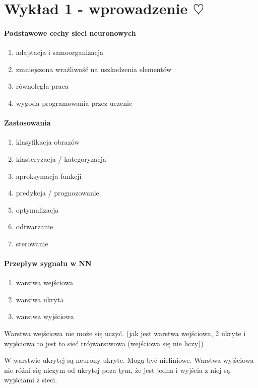 \section{Wykład 1 - wprowadzenie $\heartsuit$ }

\paragraph{Podstawowe cechy sieci neuronowych}

\begin{enumerate}
 \item adaptacja i samoorganizacja
 \item zmniejszona wrażliwość na uszkodzenia elementów
 \item równoległa praca
 \item wygoda programowania przez uczenie
\end{enumerate}

\paragraph{Zastosowania}

\begin{enumerate}
 \item klasyfikacja obrazów
 \item klasteryzacja / kategoryzacja
 \item aproksymacja funkcji 
 \item predykcja / prognozowanie
 \item optymalizacja
 \item odtwarzanie
 \item sterowanie
\end{enumerate}

\paragraph{Przepływ sygnału w NN}

\begin{enumerate}
 \item warstwa wejściowa
 \item warstwa ukryta
 \item warstwa wyjściowa
\end{enumerate}

Warstwa wejściowa nie może się uczyć. (jak jest warstwa wejściowa, 2 ukryte i wyjściowa to jest 
to sieć trójwarstwowa (wejściowa się nie liczy))

W warstwie ukrytej są neurony ukryte. Mogą być nieliniowe. Warstwa wyjściowa nie różni się niczym
od ukrytej poza tym, że jest jedna i wyjścia z niej są wyjściami z sieci.